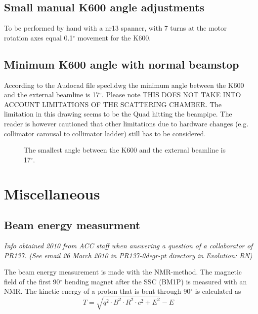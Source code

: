 \documentclass[11pt]{report}
\begin{document}
\section{Small manual K600 angle adjustments}

To be performed by hand with a nr13 spanner, with 7 turns at the motor rotation axes equal 0.1$^{\circ}$ movement for the K600.


\section{Minimum K600 angle with normal beamstop}

According to the Audocad file specl.dwg the minimum angle between the K600 and the external beamline
is 17$^{\circ}$. Please note THIS DOES NOT TAKE INTO ACCOUNT LIMITATIONS OF THE SCATTERING CHAMBER.
The limitation in this drawing seems to be the Quad hitting the beampipe. The reader is however cautioned
that other limitations due to hardware changes (e.g. collimator carousal to collimator ladder) still
has to be considered.


\begin{figure}[!ht]
\centerline{\vspace{0cm}\hspace{0cm}
}
\centering
	\caption{The smallest angle between the K600 and the external beamline is 17$^{\circ}$.}
	\label{fig:k600smallestangle}
\end{figure} 



\clearpage




\chapter{Miscellaneous}

\section{Beam energy measurment}
{\it Info obtained 2010 from ACC staff when answering a question of a collaborator of PR137.
(See email 26 March 2010 in PR137-0degr-pt directory in Evolution: RN)}

The beam energy measurement is made with the NMR-method.
The magnetic field of the first 90$^{\circ}$ bending magnet after the SSC
(BM1P) is measured with an NMR. The kinetic energy of a proton that is
bent through 90$^{\circ}$ is calculated as
\begin{equation}
	T = \sqrt{q^2 \cdot B^2 \cdot R^2  \cdot c^2 + E^2} - E
\end{equation}
 
\end{document}
